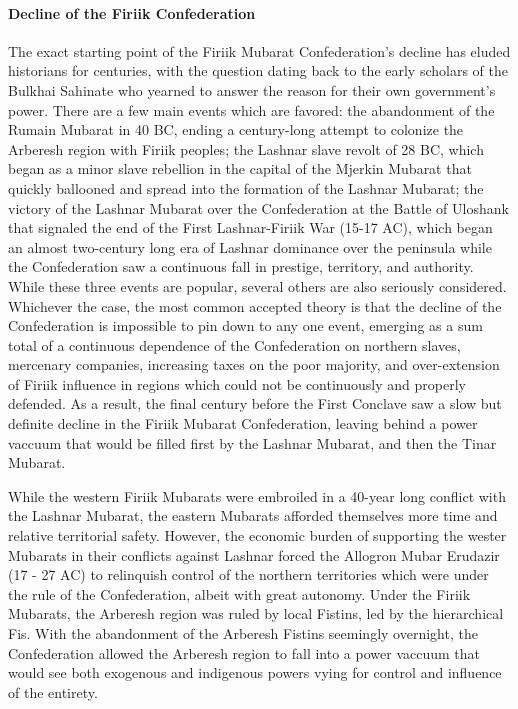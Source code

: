 		\paragraph{Decline of the Firiik Confederation}
			The exact starting point of the Firiik Mubarat Confederation's decline has eluded historians for centuries, with the question dating back to the early scholars of the Bulkhai Sahinate who yearned to answer the reason for their own government's power. There are a few main events which are favored: the abandonment of the Rumain Mubarat in 40 BC, ending a century-long attempt to colonize the Arberesh region with Firiik peoples; the Lashnar slave revolt of 28 BC, which began as a minor slave rebellion in the capital of the Mjerkin Mubarat that quickly ballooned and spread into the formation of the Lashnar Mubarat; the victory of the Lashnar Mubarat over the Confederation at the Battle of Uloshank that signaled the end of the First Lashnar-Firiik War (15-17 AC), which began an almost two-century long era of Lashnar dominance over the peninsula while the Confederation saw a continuous fall in prestige, territory, and authority. While these three events are popular, several others are also seriously considered. Whichever the case, the most common accepted theory is that the decline of the Confederation is impossible to pin down to any one event, emerging as a sum total of a continuous dependence of the Confederation on northern slaves, mercenary companies, increasing taxes on the poor majority, and over-extension of Firiik influence in regions which could not be continuously and properly defended. As a result, the final century before the First Conclave saw a slow but definite decline in the Firiik Mubarat Confederation, leaving behind a power vaccuum that would be filled first by the Lashnar Mubarat, and then the Tinar Mubarat.
			
			While the western Firiik Mubarats were embroiled in a 40-year long conflict with the Lashnar Mubarat, the eastern Mubarats afforded themselves more time and relative territorial safety. However, the economic burden of supporting the wester Mubarats in their conflicts against Lashnar forced the Allogron Mubar Erudazir (17 - 27 AC) to relinquish control of the northern territories which were under the rule of the Confederation, albeit with great autonomy. Under the Firiik Mubarats, the Arberesh region was ruled by local Fistins, led by the hierarchical Fis. With the abandonment of the Arberesh Fistins seemingly overnight, the Confederation allowed the Arberesh region to fall into a power vaccuum that would see both exogenous and indigenous powers vying for control and influence of the entirety.
